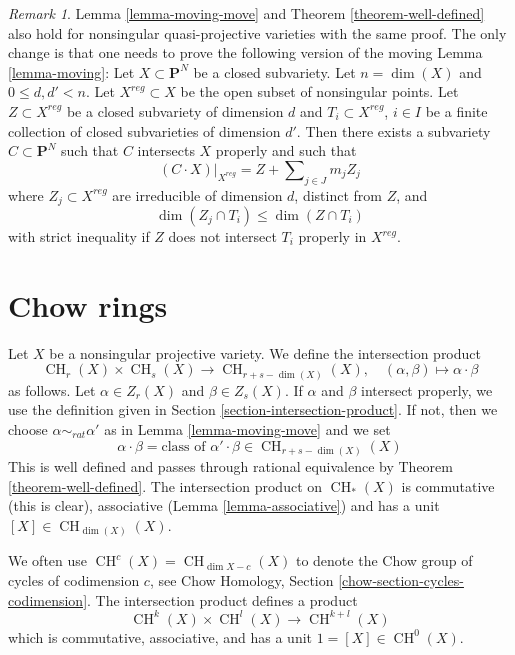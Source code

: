 \documentclass{stacks-project}
\theoremstyle{plain}
\theoremstyle{definition}
\theoremstyle{remark}
\newtheorem{remark}[subsection]{Remark}
\numberwithin{equation}{subsection}
\def\CH{\mathop{\mathrm{CH}}\nolimits}
\begin{document}
\begin{remark}
\label{remark-quasi-projective}
Lemma \ref{lemma-moving-move} and
Theorem \ref{theorem-well-defined}
also hold for nonsingular quasi-projective varieties with
the same proof. The only change is that one needs to prove the following
version of the moving Lemma \ref{lemma-moving}: Let  $X \subset \mathbf{P}^N$
be a closed subvariety. Let $n = \dim(X)$ and $0 \leq d, d' < n$. Let
$X^{reg} \subset X$ be the open subset of nonsingular points. Let
$Z \subset X^{reg}$ be a closed subvariety of dimension $d$ and
$T_i \subset X^{reg}$, $i \in I$ be a finite collection of closed subvarieties
of dimension $d'$. Then there exists a subvariety $C \subset \mathbf{P}^N$
such that $C$ intersects $X$ properly and such that
$$
(C \cdot X)|_{X^{reg}} = Z + \sum\nolimits_{j \in J} m_j Z_j
$$
where $Z_j \subset X^{reg}$ are irreducible of dimension $d$, distinct
from $Z$, and
$$
\dim(Z_j \cap T_i) \leq \dim(Z \cap T_i)
$$
with strict inequality if $Z$ does not intersect $T_i$ properly in $X^{reg}$.
\end{remark}



\section{Chow rings}
\label{section-chow-rings}

\noindent
Let $X$ be a nonsingular projective variety. We define the intersection
product
$$
\CH_r(X) \times \CH_s(X) \longrightarrow \CH_{r + s - \dim(X)}(X),\quad
(\alpha, \beta) \longmapsto \alpha \cdot \beta
$$
as follows. Let $\alpha \in Z_r(X)$ and $\beta \in Z_s(X)$.
If $\alpha$ and $\beta$ intersect properly, we use the
definition given in Section \ref{section-intersection-product}.
If not, then we choose $\alpha \sim_{rat} \alpha'$ as in
Lemma \ref{lemma-moving-move} and we set
$$
\alpha \cdot \beta =
\text{class of }\alpha' \cdot \beta \in \CH_{r + s - \dim(X)}(X)
$$
This is well defined and passes through rational equivalence by
Theorem \ref{theorem-well-defined}. The intersection product
on $\CH_*(X)$ is commutative (this is clear), associative
(Lemma \ref{lemma-associative}) and has a unit $[X] \in \CH_{\dim(X)}(X)$.

\medskip\noindent
We often use $\CH^c(X) = \CH_{\dim X - c}(X)$ to denote the Chow group of
cycles of codimension $c$, see
Chow Homology, Section \ref{chow-section-cycles-codimension}.
The intersection product defines a product
$$
\CH^k(X) \times \CH^l(X) \longrightarrow \CH^{k + l}(X)
$$
which is commutative, associative, and has a unit $1 = [X] \in \CH^0(X)$.
\end{document}
